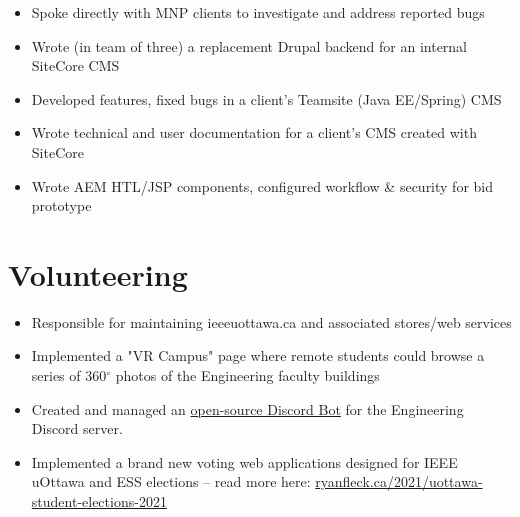 \documentclass[]{rcf_cv}
\begin{document}
		\begin{itemize}
			\setlength\itemsep{-0.4em}
			\renewcommand\labelitemi{--}
			
			\item Spoke directly with MNP clients to investigate and address reported bugs
			\item Wrote (in team of three) a replacement Drupal backend for an internal SiteCore CMS
			\item Developed features, fixed bugs in a client's Teamsite (Java EE/Spring) CMS
			\item Wrote technical and user documentation for a client's CMS created with SiteCore 
			\item Wrote AEM HTL/JSP components, configured workflow \& security for bid prototype

			
		\end{itemize}
	
	\newpage
	

		
	\section{Volunteering}
	
	
	\begin{itemize}
		\setlength\itemsep{-0.4em}
		\renewcommand\labelitemi{--}
		
		\item Responsible for maintaining ieeeuottawa.ca and associated stores/web services
		\item Implemented a "VR Campus" page where remote students could browse a series of 360$^{\circ}$ photos of the Engineering faculty buildings
		\item Created and managed an \href{https://github.com/ieee-uottawa/SITE-Bot}{open-source Discord Bot} for the Engineering Discord server.
		\item Implemented a brand new voting web applications designed for IEEE uOttawa and ESS elections -- read more here: \href{https://www.ryanfleck.ca/2021/uottawa-student-elections-2021/}{ryanfleck.ca/2021/uottawa-student-elections-2021}
		
	\end{itemize}
	
\end{document}
